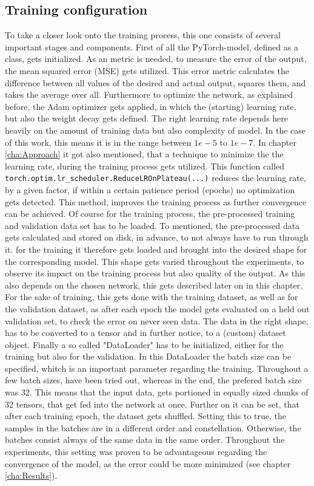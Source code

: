 \subsection{Training configuration}
To take a closer look onto the training process, this one consists of several important stages and components. First of all the PyTorch-model, defined as a class, gets initialized. As an metric is needed, to measure the error of the output, the mean squared error (MSE) gets utilized. This error metric calculates the difference between all values of the desired and actual output, squares them, and takes the average over all. Furthermore to optimize the network, as explained before, the Adam optimizer gets applied, in which the (starting) learning rate, but also the weight decay gets defined. The right learning rate depends here heavily on the amount of training data but also complexity of model. In the case of this work, this means it is in the range between $1e-5$ to $1e-7$. In chapter \ref{cha:Approach} it got also mentioned, that a technique to minimize the the learning rate, during the training process gets utilized. This function called \texttt{torch.optim.lr\_scheduler.ReduceLROnPlateau(...)} reduces the learning rate, by a given factor, if within a certain patience period (epochs) no optimization gets detected. This method, improves the training process as further convergence can be achieved. Of course for the training process, the pre-processed training and validation data set has to be loaded. To mentioned, the pre-processed data gets calculated and stored on disk, in advance, to not always have to run through it. for the training it therefore gets loaded and brought into the desired shape for the corresponding model. This shape gets varied throughout the experiments, to observe its impact on the training process but also quality of the output. As this also depends on the chosen network, this gets described later on in this chapter. For the sake of training, this gets done with the training dataset, as well as for the validation dataset, as after each epoch the model gets evaluated on a held out validation set, to check the error on never seen data.
The data in the right shape, has to be converted to a tensor and in further notice, to a (custom) dataset object. Finally a so called "DataLoader" has to be initialized, either for the training but also for the validation. In this DataLoader the batch size can be specified, whitch is an important parameter regarding the training. Throughout a few batch sizes, have been tried out, whereas in the end, the prefered batch size was 32. This means that the input data, gets portioned in equally sized chunks of 32 tensors, that get fed into the network at once. Further on it can be set, that after each training epoch, the dataset gets shuffled. Setting this to true, the samples in the batches are in a different order and constellation. Otherwise, the batches consist always of the same data in the same order. Throughout the experiments, this setting was proven to be advantageous regarding the convergence of the model, as the error could be more minimized (see chapter \ref{cha:Results}).

